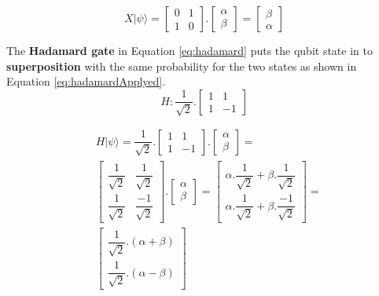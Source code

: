 			\begin{equation}
				\label{eq:flipApplyed}
				X|\psi\rangle = \begin{bmatrix}
					0& 1 \\
					1& 0
				\end{bmatrix} . \begin{bmatrix}
					\alpha \\
					\beta
				\end{bmatrix} = \begin{bmatrix}
					\beta \\
					\alpha
				\end{bmatrix}
			\end{equation}
		
		
			\par The \textbf{Hadamard gate} in Equation \ref{eq:hadamard} puts the qubit state in to \textbf{superposition} \cite{qcfcs}  with the same probability for the two states \cite{da2018introduccao} as shown in Equation \ref{eq:hadamardApplyed}.
			\begin{equation}
				\label{eq:hadamard}
				H : \dfrac{1}{\sqrt{2}}.
				\begin{bmatrix}
					1& 1 \\
					1& -1
				\end{bmatrix}
			\end{equation}
			
			\begin{equation}
				\label{eq:hadamardApplyed}
				\begin{aligned}
					&H|\psi\rangle = \dfrac{1}{\sqrt{2}}.\begin{bmatrix}
						1& 1 \\
						1& -1
					\end{bmatrix} . \begin{bmatrix}
						\alpha \\
						\beta
					\end{bmatrix} = \\
					&\begin{bmatrix}
						\dfrac{1}{\sqrt{2}} &\dfrac{1}{\sqrt{2}} \\
						\dfrac{1}{\sqrt{2}} &\dfrac{-1}{\sqrt{2}}
					\end{bmatrix} .
					\begin{bmatrix}
						\alpha \\
						\beta
					\end{bmatrix} = 
					\begin{bmatrix}
						\alpha . \dfrac{1}{\sqrt{2}} + \beta.\dfrac{1}{\sqrt{2}} \\
						\alpha . \dfrac{1}{\sqrt{2}} + \beta.\dfrac{-1}{\sqrt{2}}
					\end{bmatrix} = \\
					&\begin{bmatrix}
						\dfrac{1}{\sqrt{2}} . (\alpha + \beta) \\
						\dfrac{1}{\sqrt{2}} . (\alpha - \beta)
					\end{bmatrix}
				\end{aligned}
			\end{equation}
		
